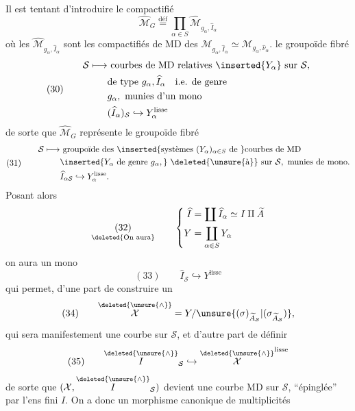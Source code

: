 Il est tentant d'introduire le compactifié
\[
\widehat{\mathcal M}_G\overset{\mathrm{déf}}{=}\prod_{\alpha\in S}\widehat{\mathcal M}_{g_\alpha,\widehat I_\alpha}
\]
où les $\widehat{\mathcal M}_{g_\alpha,\widehat I_\alpha}$ sont les compactifiés de MD des $\mathcal M_{g_\alpha,\widehat I_\alpha}\simeq\mathcal M_{g_\alpha,\widehat\nu_\alpha}$.   le groupoïde fibré
\[
(30)\qquad\begin{aligned}
\mathcal S\longmapsto&\ \text{courbes de MD relatives }\inserted{Y_\alpha}\text{ sur }\mathcal S,\\
&\text{de type }g_\alpha,\widehat I_\alpha\quad\text{i.e. de genre}\\
&g_\alpha,\text{ munies d'un mono}\\
&(\widehat I_\alpha)_{\mathcal S}\hookrightarrow Y_\alpha^{\text{lisse}}
\end{aligned}
\]
de sorte que $\widehat{\mathcal M}_G$ représente le groupoïde fibré
\[
(31)\qquad\begin{aligned}
\mathcal S\longmapsto&\ \text{groupoïde des }\inserted{\text{systèmes }(Y_\alpha)_{\alpha\in S}\text{ de }}\text{courbes de MD}\\
&\inserted{Y_\alpha\text{ de genre }g_\alpha,}\ \text{\deleted{\unsure{à}} sur }\mathcal S,\text{ munies de mono.}\\
&\widehat I_{\alpha\mathcal S}\hookrightarrow Y_\alpha^{\text{lisse}}.
\end{aligned}
\]
Posant alors
\[
\underset{\text{\deleted{On aura}}}{(32)}\qquad\left\{\begin{aligned}
\widehat I&=\coprod\widehat I_\alpha\simeq I\amalg\widetilde A\\
Y&=\coprod_{\alpha\in S}Y_\alpha
\end{aligned}\right.
\]
on aura un mono
\[
(33)\qquad\widehat I_{\mathcal S}\hookrightarrow Y^{\text{lisse}}
\]
qui permet, d'une part de construire un
\[
(34)\qquad\overset{\deleted{\unsure{\wedge}}}{\mathcal X}=Y/\unsure{(\sigma)_{\widetilde A_{\mathcal S}}|(\sigma_{\widetilde A_{\mathcal S}})},
\]
qui sera manifestement une courbe  sur $\mathcal S$, et d'autre part de définir
\[
(35)\qquad\overset{\deleted{\unsure{\wedge}}}{I}_{\mathcal S}\hookrightarrow\overset{\deleted{\unsure{\wedge}}}{\mathcal X}^{\text{lisse}}
\]
de sorte que $(\mathcal X,\overset{\deleted{\unsure{\wedge}}}{I}_{\mathcal S})$ devient une courbe  MD sur $\mathcal S$, ``épinglée'' par l'ens fini $I$. On a donc un morphisme canonique de multiplicités
